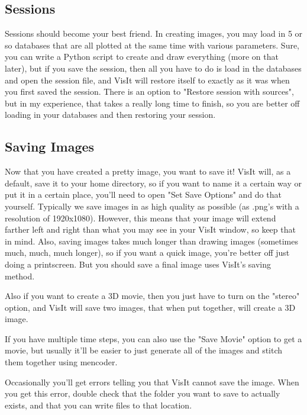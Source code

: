 \documentclass[english]{article}
\begin{document}
    \subsection{Sessions}
    Sessions should become your best friend. In creating images, you may load in 5 or so databases that
    are all plotted at the same time with various parameters. Sure, you can write a Python script to
    create and draw everything (more on that later), but if you save the session, then all you have to do
    is load in the databases and open the session file, and VisIt will restore itself to exactly as it was
    when you first saved the session. There is an option to "Restore session with sources", but in my
    experience, that takes a really long time to finish, so you are better off loading in your databases
    and then restoring your session.

    \subsection{Saving Images}
    Now that you have created a pretty image, you want to save it! VisIt will, as a default, save it to
    your home directory, so if you want to name it a certain way or put it in a certain place, you'll 
    need to open "Set Save Options" and do that yourself. Typically we save images in as high quality as
    possible (as .png's with a resolution of 1920x1080). However, this means that your image will extend
    farther left and right than what you may see in your VisIt window, so keep that in mind. Also, saving
    images takes much longer than drawing images (sometimes much, much, much longer), so if you want a 
    quick image, you're better off just doing a printscreen. But you should save a final image uses VisIt's
    saving method.

    Also if you want to create a 3D movie, then you just have to turn on the "stereo" option, and VisIt 
    will save two images, that when put together, will create a 3D image.

    If you have multiple time steps, you can also use the "Save Movie" option to get a movie, but usually
    it'll be easier to just generate all of the images and stitch them together using mencoder.

    Occasionally you'll get errors telling you that VisIt cannot save the image. When you get this error,
    double check that the folder you want to save to actually exists, and that you can write files to that
    location.
\end{document}
